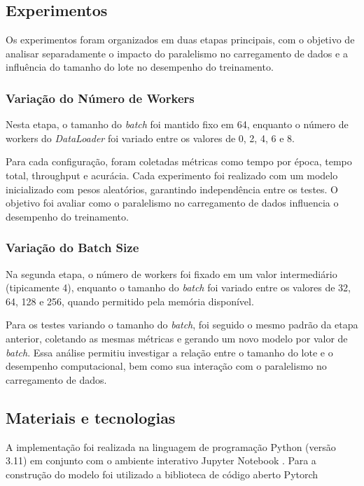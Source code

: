 \documentclass[a4paper,11pt]{article}
\begin{document}
\subsection{Experimentos}

Os experimentos foram organizados em duas etapas principais, com o objetivo de analisar separadamente o impacto do paralelismo no carregamento de dados e a influência do tamanho do lote no desempenho do treinamento.

\subsubsection{Variação do Número de Workers}

Nesta etapa, o tamanho do \textit{batch} foi mantido fixo em 64, enquanto o número de workers do \textit{DataLoader} foi variado entre os valores de 0, 2, 4, 6 e 8.

Para cada configuração, foram coletadas métricas como tempo por época, tempo total, throughput e acurácia. 
Cada experimento foi realizado com um modelo inicializado com pesos aleatórios, garantindo independência entre os testes.
O objetivo foi avaliar como o paralelismo no carregamento de dados influencia o desempenho do treinamento.


\subsubsection{Variação do Batch Size}

Na segunda etapa, o número de workers foi fixado em um valor intermediário (tipicamente 4), enquanto o tamanho do \textit{batch} foi variado entre os valores de 32, 64, 128 e 256, quando permitido pela memória disponível.

Para os testes variando o tamanho do \textit{batch}, foi seguido o mesmo padrão da etapa anterior, coletando as mesmas métricas e gerando um novo modelo por valor de \textit{batch}.
Essa análise permitiu investigar a relação entre o tamanho do lote e o desempenho computacional, bem como sua interação com o paralelismo no carregamento de dados.

\subsection{Materiais e tecnologias}\label{MT}

A implementação foi realizada na linguagem de programação Python (versão 3.11) \cite{python} em conjunto com o ambiente interativo Jupyter Notebook \cite{jupyter}.
Para a construção do modelo foi utilizado a biblioteca de código aberto Pytorch \cite{pytorch}
\end{document}
